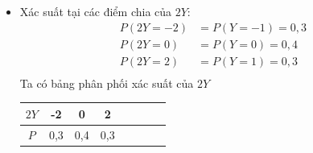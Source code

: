 \documentclass[12pt]{article}
\begin{document}
\begin{itemize}
    \item Xác suất tại các điểm chia của $2Y$:
    \[
    \begin{aligned}
    P(2Y = -2) &= P(Y = -1) = 0,3 \\
    P(2Y = 0) &= P(Y = 0) = 0,4 \\
    P(2Y = 2) &= P(Y = 1) = 0,3 \\
    \end{aligned}
    \]
    Ta có bảng phân phối xác suất của $2Y$
    \begin{center}
        \begin{tabular}{|Sc|Sc|Sc|Sc|}
        \hline
        $2Y$ & -2  & 0 &  2 \\
        \hline
        $P$ & 0,3 & 0,4 & 0,3 \\
        \hline
        \end{tabular}
    \end{center}

    \clearpage


\end{itemize}
\end{document}
